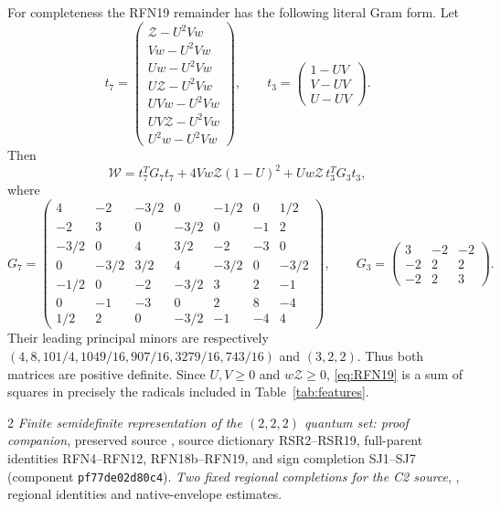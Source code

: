 \documentclass[10pt]{article}
\newcommand{\W}{\mathcal W}
\newcommand{\Zc}{\mathcal Z}
\begin{document}
For completeness the RFN19 remainder has the following literal Gram form.
Let
\[
 t_7=\begin{pmatrix}
 \Zc-U^2Vw\\Vw-U^2Vw\\Uw-U^2Vw\\U\Zc-U^2Vw\\
 UVw-U^2Vw\\UV\Zc-U^2Vw\\U^2w-U^2Vw
 \end{pmatrix},\qquad
 t_3=\begin{pmatrix}1-UV\\V-UV\\U-UV\end{pmatrix}.
\]
Then
\begin{equation}
 \W=t_7^TG_7t_7+4Vw\Zc(1-U)^2+Uw\Zc\,t_3^TG_3t_3,
 \label{eq:RFN19}
\end{equation}
where
\[
 G_7=\begin{pmatrix}
4&-2&-3/2&0&-1/2&0&1/2\\
-2&3&0&-3/2&0&-1&2\\
-3/2&0&4&3/2&-2&-3&0\\
0&-3/2&3/2&4&-3/2&0&-3/2\\
-1/2&0&-2&-3/2&3&2&-1\\
0&-1&-3&0&2&8&-4\\
1/2&2&0&-3/2&-1&-4&4
\end{pmatrix},\qquad
 G_3=\begin{pmatrix}3&-2&-2\\-2&2&2\\-2&2&3\end{pmatrix}.
\]
Their leading principal minors are respectively
$(4,8,101/4,1049/16,907/16,3279/16,743/16)$ and $(3,2,2)$.
Thus both matrices are positive definite. Since $U,V\geq0$ and
$w\Zc\geq0$, \eqref{eq:RFN19} is a sum of squares in precisely the
radicals included in Table~\ref{tab:features}.

\begin{thebibliography}{2}
\emph{Finite semidefinite representation of the $(2,2,2)$ quantum set:
proof companion}, preserved source
, source dictionary RSR2--RSR19,
full-parent identities RFN4--RFN12, RFN18b--RFN19, and sign completion
SJ1--SJ7 (component \texttt{pf77de02d80c4}).
\emph{Two fixed regional completions for the C2 source},
,
regional identities and native-envelope estimates.
\end{thebibliography}
\end{document}
